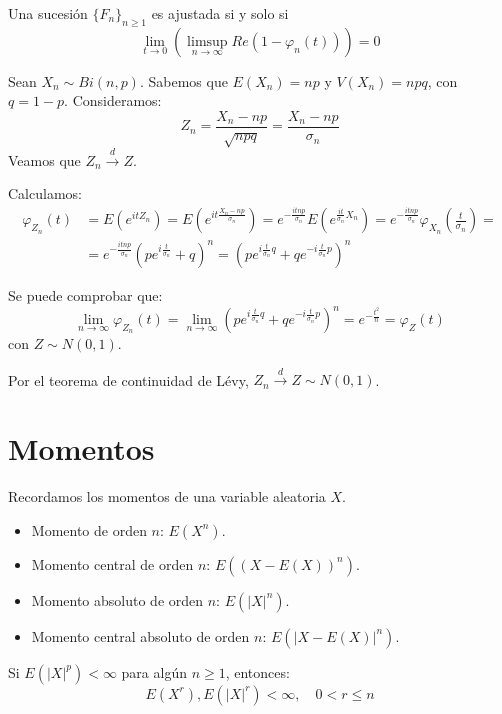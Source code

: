 \begin{theorem}
    Una sucesión $\{F_n\}_{n \geq 1}$ es ajustada si y solo si $$\lim\limits_{t \to 0} \left( \limsup\limits_{n \to \infty} Re(1 - \varphi_n(t))\right) = 0$$
\end{theorem}

\begin{remark}
    Sean $X_n \sim Bi(n, p)$.
    Sabemos que $E(X_n) = np$ y $V(X_n) = npq$, con $q = 1-p$.
    Consideramos:
    $$Z_n = \frac{X_n - np}{\sqrt{npq}} = \frac{X_n - np}{\sigma_n}$$
    Veamos que $Z_n \xrightarrow{d} Z$.

    Calculamos:
    \begin{align*}
        \varphi_{Z_n}(t) & = E(e^{itZ_n}) = E(e^{it\frac{X_n-np}{\sigma_n}}) = e^{-\frac{itnp}{\sigma_n}} E(e^{\frac{it}{\sigma_n}X_n}) = e^{-\frac{itnp}{\sigma_n}} \varphi_{X_n} \left(\frac{t}{\sigma_n}\right) = \\
                         & = e^{-\frac{itnp}{\sigma_n}} (pe^{i\frac{t}{\sigma_n}} + q)^n = (pe^{i\frac{t}{\sigma_n}q} + qe^{-i\frac{t}{\sigma_n}p})^n
    \end{align*}

    Se puede comprobar que:
    $$\lim\limits_{n \to \infty} \varphi_{Z_n}(t) = \lim\limits_{n \to \infty} (pe^{i\frac{t}{\sigma_n}q} + qe^{-i\frac{t}{\sigma_n}p})^n = e^{-\frac{t^2}{n}} = \varphi_Z(t)$$
    con $Z \sim N(0, 1)$.

    Por el teorema de continuidad de Lévy, $Z_n \xrightarrow{d} Z \sim N(0, 1)$.
\end{remark}

\section{Momentos}
Recordamos los momentos de una variable aleatoria $X$.
\begin{itemize}
    \item Momento de orden $n$: $E(X^n)$.
    \item Momento central de orden $n$: $E((X-E(X))^n)$.
    \item Momento absoluto de orden $n$: $E(|X|^n)$.
    \item Momento central absoluto de orden $n$: $E(|X-E(X)|^n)$.
\end{itemize}

\begin{proposition}
    Si $E(|X|^p) < \infty$ para algún $n \geq 1$, entonces:
    $$E(X^r), E(|X|^r) < \infty, \quad 0 < r \leq n$$
\end{proposition}

